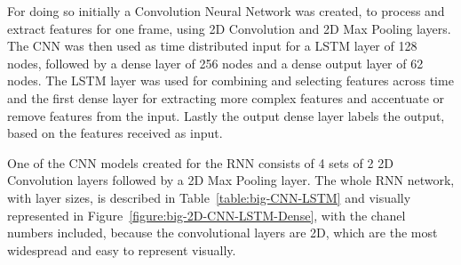 \documentclass[12pt]{article}
\theoremstyle{definition}
\begin{document}
	For doing so initially a Convolution Neural Network was created, to process and extract features for one frame, using 2D Convolution and 2D Max Pooling layers. The CNN was then used as time distributed input for a LSTM layer of 128 nodes, followed by a dense layer of 256 nodes and a dense output layer of 62 nodes.
	The LSTM layer was used for combining and selecting features across time and the first dense layer for extracting more complex features and accentuate or remove features from the input. Lastly the output dense layer labels the output, based on the features received as input.

	One of the CNN models created for the RNN consists of 4 sets of 2 2D Convolution layers followed by a 2D Max Pooling layer. The whole RNN network, with layer sizes, is described in Table~\ref{table:big-CNN-LSTM} and visually represented in Figure~\ref{figure:big-2D-CNN-LSTM-Dense}, with the chanel numbers included, because the convolutional layers are 2D, which are the most widespread and easy to represent visually.
\end{document}
